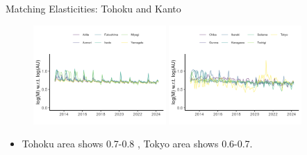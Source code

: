 \documentclass[aspectratio=169]{beamer}
\begin{document}
\begin{frame}{Matching Elasticities: Tohoku and Kanto}
\begin{figure}[!ht]
  \begin{center}
  \includegraphics[width = 0.45\textwidth]
  {figuretable/elasticity_unemployed_month_aggregate_tohoku.png}
  \includegraphics[width = 0.45\textwidth]
  {figuretable/elasticity_unemployed_month_aggregate_kanto.png}
  \end{center}
  \footnotesize
\end{figure} 
\begin{itemize}
    \item Tohoku area shows 0.7-0.8 , Tokyo area shows 0.6-0.7.
\end{itemize}
\end{frame}
\end{document}
